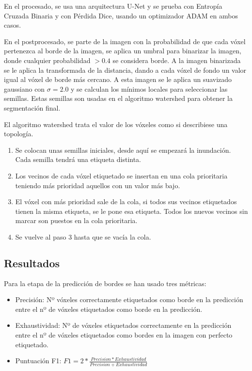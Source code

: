 En el procesado, se usa una arquitectura U-Net y se prueba con Entropía Cruzada Binaria y con Pérdida Dice, usando un optimizador ADAM en ambos casos.

En el postprocesado, se parte de la imagen con la probabilidad de que cada vóxel pertenezca al borde de la imagen, se aplica un umbral para binarizar la imagen, donde cualquier probabilidad $>0.4$ se considera borde. A la imagen binarizada se le aplica la transformada de la distancia, dando a cada vóxel de fondo un valor igual al vóxel de borde más cercano. A esta imagen se le aplica un suavizado gaussiano con $\sigma = 2.0$ y se calculan los mínimos locales para seleccionar las semillas. Estas semillas son usadas en el algoritmo watershed para obtener la segmentación final.

El algoritmo watershed trata el valor de los vóxeles como si describiese una topología.
\begin{enumerate}
\item Se colocan unas semillas iniciales, desde aquí se empezará la inundación. Cada semilla tendrá una etiqueta distinta.
\item Los vecinos de cada vóxel etiquetado se insertan en una cola prioritaria teniendo más prioridad aquellos con un valor más bajo.
\item El vóxel con más prioridad sale de la cola, si todos sus vecinos etiquetados tienen la misma etiqueta, se le pone esa etiqueta. Todos los nuevos vecinos sin marcar son puestos en la cola prioritaria.
\item Se vuelve al paso 3 hasta que se vacía la cola.
\end{enumerate}

\subsection{Resultados}


Para la etapa de la predicción de bordes se han usado tres métricas:
\begin{itemize}
\item Precisión: Nº vóxeles correctamente etiquetados como borde en la predicción entre el nº de vóxeles etiquetados como borde en la predicción.
\item Exhaustividad: Nº de vóxeles etiquetados correctamente en la predicción entre el nº de vóxeles etiquetados como bordes en la imagen con perfecto etiquetado.
\item Puntuación F1: $F1=2*\frac{Precision * Exhaustividad}{Precision+Exhaustividad}$
\end{itemize}

